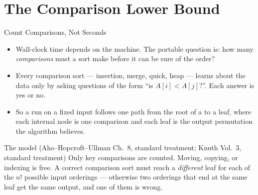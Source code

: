 \documentclass[aspectratio=169]{beamer}
\begin{document}

\section{The Comparison Lower Bound}


\begin{frame}{Count Comparisons, Not Seconds}
  \begin{itemize}
    \item Wall-clock time depends on the machine. The portable question is:
      how many \emph{comparisons} must a sort make before it can be sure of
      the order?
    \item Every comparison sort --- insertion, merge, quick, heap --- learns
      about the data only by asking questions of the form ``is $A[i] <
      A[j]$?''. Each answer is yes or no.
    \item So a run on a fixed input follows one path from the root of a
       to a leaf, where each internal node is one
      comparison and each leaf is the output permutation the algorithm
      believes.
  \end{itemize}
  \begin{block}{The model (Aho--Hopcroft--Ullman Ch.~8, standard treatment;
    Knuth Vol.~3, standard treatment)}
    Only key comparisons are counted. Moving, copying, or indexing is free.
    A correct comparison sort must reach a \emph{different} leaf for each of
    the $n!$ possible input orderings --- otherwise two orderings that end at
    the same leaf get the same output, and one of them is wrong.
    \cite{AhoHopcroftUllman1983_data_structures_algorithms,Knuth1998_taocp_volume3}
  \end{block}
\end{frame}
\end{document}
